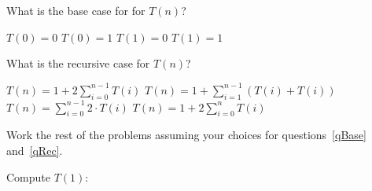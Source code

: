 \documentclass[12pt]{exam}
\begin{document}
\clearpage

\begin{questions}


	\question[1] \label{qBase} What is the base case for for $T(n)$?
	\begin{choices}
		\choice $T(0) = 0$ 				%
		\choice $T(0) = 1$ 				%
		\choice $T(1) = 0$ 				%
		\choice $T(1) = 1$ 				%
	\end{choices}

	\fbox{\begin{minipage}[t]{14.55cm} \color{red}
			\vspace{25pt}
				
			\begin{center}
				B. $T(0) = 1$
			\end{center}
				
			\vspace{25pt}
		\end{minipage}
	}
		
\clearpage

	\question[1] \label{qRec} What is the recursive case for $T(n)$?
	\begin{choices}
		\choice $\displaystyle T(n) = 1 + 2\sum_{i=0}^{n-1}{T(i)}$					%
		\choice $\displaystyle T(n) = 1 + \sum_{i=1}^{n-1}{\left(T(i)+T(i)\right)}$	%
		\choice $\displaystyle T(n) = \sum_{i=0}^{n-1}{2\cdot T(i)}$				%
		\choice $\displaystyle T(n) = 1 + 2\sum_{i=0}^{n}{T(i)}$					%
	\end{choices}

	
	
	\vspace{100pt}
	Work the rest of the problems assuming your choices for questions~\ref{qBase} and~\ref{qRec}. 

\clearpage

	\question[1] Compute $T(1)$:
	
		
	\fbox{\begin{minipage}[t]{14.55cm} \color{red}
			\vspace{25pt}
				

\end{minipage}}
\end{questions}
\end{document}
